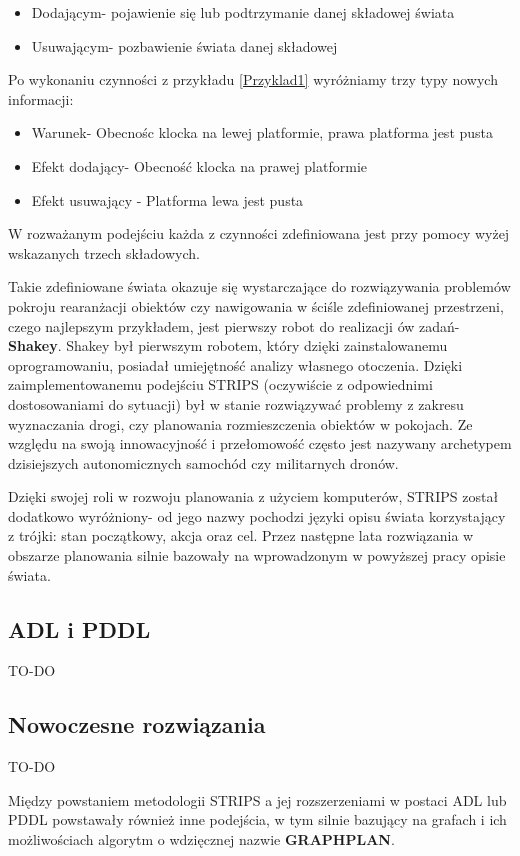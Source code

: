     \begin{itemize}
        \item Dodającym- pojawienie się lub podtrzymanie danej składowej świata
        \item Usuwającym- pozbawienie świata danej składowej
    \end{itemize}
    Po wykonaniu czynności z przykładu \ref{Przyklad1} wyróżniamy trzy typy nowych informacji:
    \begin{itemize}
        \item Warunek- Obecnośc klocka na lewej platformie, prawa platforma jest pusta
        \item Efekt dodający- Obecność klocka na prawej platformie
        \item Efekt usuwający - Platforma lewa jest pusta
    \end{itemize}
    W rozważanym podejściu każda z czynności zdefiniowana jest przy pomocy wyżej wskazanych trzech składowych.

        Takie zdefiniowane świata okazuje się wystarczające do rozwiązywania problemów pokroju rearanżacji obiektów czy 
    nawigowania w ściśle zdefiniowanej przestrzeni, czego najlepszym przykładem, jest pierwszy robot do realizacji ów zadań- \textbf{Shakey}.
    Shakey był pierwszym robotem, który dzięki zainstalowanemu oprogramowaniu,
    posiadał umiejętność analizy własnego otoczenia. Dzięki zaimplementowanemu podejściu 
    STRIPS (oczywiście z odpowiednimi dostosowaniami do sytuacji) był w stanie rozwiązywać problemy z zakresu wyznaczania drogi,
    czy planowania rozmieszczenia obiektów w pokojach.
    Ze względu na swoją innowacyjność i przełomowość często jest nazywany archetypem
    dzisiejszych autonomicznych samochód czy militarnych dronów.

    Dzięki swojej roli w rozwoju planowania z użyciem komputerów, STRIPS został dodatkowo wyróżniony- od jego nazwy pochodzi języki opisu świata korzystający
    z trójki: stan początkowy, akcja oraz cel. Przez następne lata rozwiązania w obszarze planowania silnie bazowały na wprowadzonym w powyższej pracy opisie świata.

    \subsection{ADL i PDDL}
    TO-DO



    \subsection{Nowoczesne rozwiązania}
    TO-DO
    
    Między powstaniem metodologii STRIPS a jej rozszerzeniami w postaci ADL lub PDDL powstawały również inne podejścia, w tym silnie 
    bazujący na grafach i ich możliwościach algorytm o wdzięcznej nazwie \textbf{GRAPHPLAN}.






